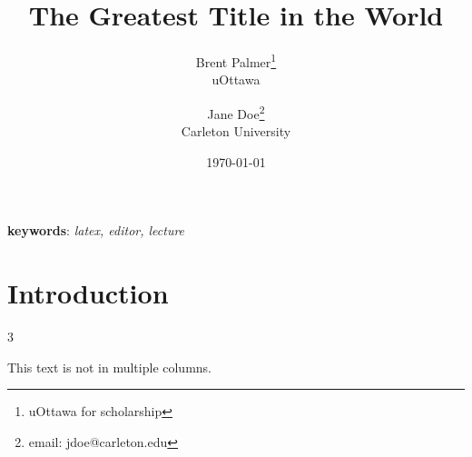 \documentclass[12pt]{article}
\title{The Greatest Title in the World}
\author{Brent Palmer\thanks{uOttawa for scholarship}\\uOttawa \and Jane Doe\thanks{email: jdoe@carleton.edu}\\Carleton University}
\date{\today}
\begin{document}
\maketitle

\begin{abstract}
	\lipsum[7]
\end{abstract}

\textbf{keywords}: \emph{latex, editor, lecture}

\section{Introduction}

\lipsum[1-6]

\begin {multicols}{3} %
	\lipsum[4-6]
\end{multicols}

This text is not in multiple columns.

\begin{landscape}
	\lipsum[1-9]
\end{landscape}
\end{document}
